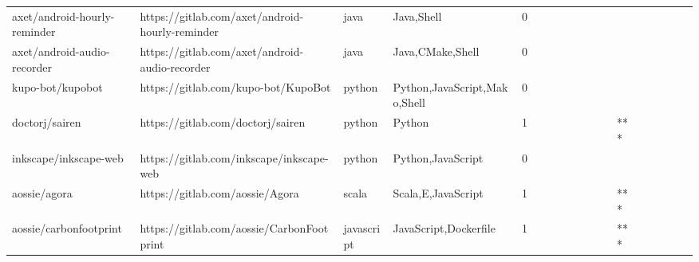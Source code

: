 \begin{tabular}{llllrlllllllllllll}
axet/android-hourly-reminder                       &    https://gitlab.com/axet/android-hourly-reminder &              java &                                         Java,Shell &       0 &         &        &           &                &                 &        &           &           &          &          &       &              &          \\
axet/android-audio-recorder                        &     https://gitlab.com/axet/android-audio-recorder &              java &                                   Java,CMake,Shell &       0 &         &        &           &                &                 &        &           &           &          &          &       &              &          \\
kupo-bot/kupobot                                   &                https://gitlab.com/kupo-bot/KupoBot &            python &                       Python,JavaScript,Mako,Shell &       0 &         &        &           &                &                 &        &           &           &          &          &       &              &          \\
doctorj/sairen                                     &                  https://gitlab.com/doctorj/sairen &            python &                                             Python &       1 &         &        &           &                &                 &        &           &       *** &          &          &       &              &          \\
inkscape/inkscape-web                              &           https://gitlab.com/inkscape/inkscape-web &            python &                                  Python,JavaScript &       0 &         &        &           &                &                 &        &           &           &          &          &       &              &          \\
aossie/agora                                       &                    https://gitlab.com/aossie/Agora &             scala &                                 Scala,E,JavaScript &       1 &         &        &           &                &                 &        &           &       *** &          &          &       &              &          \\
aossie/carbonfootprint                             &          https://gitlab.com/aossie/CarbonFootprint &        javascript &                              JavaScript,Dockerfile &       1 &         &        &           &                &                 &        &           &       *** &          &          &       &              &          \\

\end{tabular}
